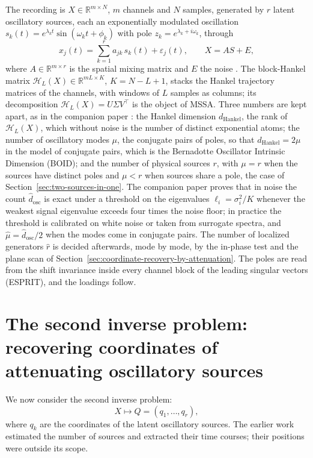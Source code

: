 \documentclass{article}
\begin{document}
The recording is $X \in \mathbb{R}^{m \times N}$, $m$ channels and $N$ samples, generated by $r$ latent oscillatory sources, each an exponentially modulated oscillation $s_k(t) = e^{\lambda_k t} \sin(\omega_k t + \phi_k)$ with pole $z_k = e^{\lambda_k + i\omega_k}$, through
\begin{equation} \label{eq:model}
x_j(t) = \sum_{k=1}^{r} a_{jk}\, s_k(t) + \varepsilon_j(t), \qquad X = AS + E,
\end{equation}
where $A \in \mathbb{R}^{m \times r}$ is the spatial mixing matrix and $E$ the noise \cite{ref-BernadotteBuchstaber, ref-Bernadotte05}. The block-Hankel matrix $\mathcal{H}_L(X) \in \mathbb{R}^{mL \times K}$, $K = N - L + 1$, stacks the Hankel trajectory matrices of the channels, with windows of $L$ samples as columns; its decomposition $\mathcal{H}_L(X) = U \Sigma V^{\top}$ is the object of MSSA. Three numbers are kept apart, as in the companion paper \cite{ref-companionA}: the Hankel dimension $d_{\mathrm{Hankel}}$, the rank of $\mathcal{H}_L(X)$, which without noise is the number of distinct exponential atoms; the number of oscillatory modes $\mu$, the conjugate pairs of poles, so that $d_{\mathrm{Hankel}} = 2\mu$ in the model of conjugate pairs, which is the Bernadotte Oscillator Intrinsic Dimension (BOID); and the number of physical sources $r$, with $\mu = r$ when the sources have distinct poles and $\mu < r$ when sources share a pole, the case of Section~\ref{sec:two-sources-in-one}. The companion paper proves that in noise the count $\widehat{d}_{\mathrm{osc}}$ is exact under a threshold on the eigenvalues $\ell_i = \sigma_i^{2}/K$ whenever the weakest signal eigenvalue exceeds four times the noise floor; in practice the threshold is calibrated on white noise or taken from surrogate spectra, and $\widehat{\mu} = \widehat{d}_{\mathrm{osc}}/2$ when the modes come in conjugate pairs. The number of localized generators $\widehat{r}$ is decided afterwards, mode by mode, by the in-phase test and the plane scan of Section~\ref{sec:coordinate-recovery-by-attenuation}. The poles are read from the shift invariance inside every channel block of the leading singular vectors (ESPRIT), and the loadings follow.
\section{The second inverse problem: recovering coordinates of attenuating oscillatory sources}\label{sec:second-inverse-problem-recovering}

We now consider the second inverse problem: \[
X \longmapsto Q = (q_1, \dots, q_r),
\] where $q_k$ are the coordinates of the latent oscillatory sources. The earlier work \cite{ref-BernadotteBuchstaber, ref-Bernadotte05, ref-Bernadotte06} estimated the number of sources and extracted their time courses; their positions were outside its scope.
\end{document}
